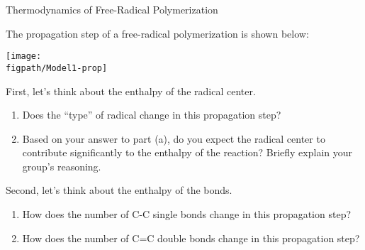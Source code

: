 \begin{activity}{Thermodynamics of Free-Radical Polymerization}
\begin{instructornotes}
\end{instructornotes}


\begin{model}
	\label{\labelbase:mdl:propthermo}

	The propagation step of a free-radical polymerization is shown below:
	
	\centerline{\texttt{[image: \\figpath/Model1-prop]}}
	
	
\end{model}


\begin{ctqs}

	\question First, let's think about the enthalpy of the radical center. \label{\labelbase:ctq:radicalenthalpy}
	
		\begin{enumerate}
		
			\item Does the ``type'' of radical change in this propagation step?
				
				\begin{solution}[0.5in]
				\end{solution}
			
			\item Based on your answer to part (a), do you expect the radical center to contribute significantly to the enthalpy of the reaction?  Briefly explain your group's reasoning.
				
				\begin{solution}[1in]
				\end{solution}
			
		\end{enumerate}
		
	\question Second, let's think about the enthalpy of the bonds. \label{\labelbase:ctq:bondenthalpy}
	
		\begin{enumerate}
			\item How does the number of C-C single bonds change in this propagation step?
				
				\begin{solution}[1in]
				\end{solution}
			
			\item How does the number of C=C double bonds change in this propagation step?
				

\end{enumerate}
\end{ctqs}
\end{activity}
